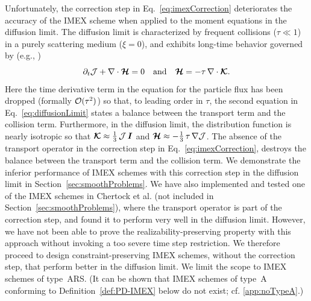 Unfortunately, the correction step in Eq.~\eqref{eq:imexCorrection} deteriorates the accuracy of the IMEX scheme when applied to the moment equations in the diffusion limit.  
The diffusion limit is characterized by frequent collisions ($\tau\ll 1$) in a purely scattering medium ($\xi=0$), and exhibits long-time behavior governed by (e.g., \cite{jinLevermore_1996})
\begin{equation}
  \partial_{t}{\mathcal{J}} + \nabla\cdot\boldsymbol{\mathcal{H}} = 0
  \quad\text{and}\quad
  \boldsymbol{\mathcal{H}} = - \tau\,\nabla\cdot\boldsymbol{\mathcal{K}}.  
  \label{eq:diffusionLimit}
\end{equation}
Here the time derivative term in the equation for the particle flux has been dropped (formally $\mathcal{O}(\tau^{2})$) so that, to leading order in $\tau$, the second equation in Eq.~\eqref{eq:diffusionLimit} states a balance between the transport term and the collision term.  
Furthermore, in the diffusion limit, the distribution function is nearly isotropic so that $\boldsymbol{\mathcal{K}}\approx\frac{1}{3}\,\mathcal{J}\,\boldsymbol{I}$ and $\boldsymbol{\mathcal{H}}\approx-\frac{1}{3}\,\tau\,\nabla\mathcal{J}$.  
The absence of the transport operator in the correction step in Eq.~\eqref{eq:imexCorrection}, destroys the balance between the transport term and the collision term.  
We demonstrate the inferior performance of IMEX schemes with this correction step in the diffusion limit in Section~\ref{sec:smoothProblems}.  
We have also implemented and tested one of the IMEX schemes in Chertock et al. \cite{chertock_etal_2015} (not included in Section~\ref{sec:smoothProblems}), where the transport operator is part of the correction step, and found it to perform very well in the diffusion limit.  
However, we have not been able to prove the realizability-preserving property with this approach without invoking a too severe time step restriction.  
We therefore proceed to design constraint-preserving IMEX schemes, without the correction step, that perform better in the diffusion limit.  
We limit the scope to IMEX schemes of type~ARS.  
(It can be shown that IMEX schemes of type~A conforming to Definition~\ref{def:PD-IMEX} below do not exist; cf. \ref{app:noTypeA}.)

